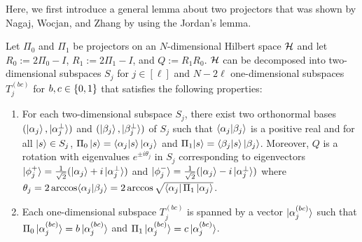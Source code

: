 Here, we first introduce a general lemma about two projectors that was shown by Nagaj, Wocjan, and Zhang \cite{NWZ09} by using the Jordan's lemma.
\begin{lemma}\label{lem:decomposition}
Let $\Pi_0$ and $\Pi_1$ be projectors on an $N$-dimensional Hilbert space $\mathcal{H}$ and let $R_0:= 2\Pi_0-I$, $R_1:= 2\Pi_1-I$, and $Q:=R_1R_0$. $\mathcal{H}$ can be decomposed into two-dimensional subspaces $S_j$ for $j\in[\ell]$ and $N-2\ell$ one-dimensional subspaces $T_j^{(bc)}$ for $b,c\in \{0,1\}$ that satisfies the following properties:
\begin{enumerate}
\item For each two-dimensional subspace $S_j$, there exist two orthonormal bases $(\ket{\alpha_j},\ket{\alpha_j^{\bot}})$ and $(\ket{\beta_j},\ket{\beta_j^{\bot}})$ of $S_j$ such that $\langle \alpha_j|\beta_j\rangle$ is a positive real and for all $ \ket{s}\in S_j$,  $\Pi_0 \ket{s} = \langle \alpha_j|s\rangle\ket{\alpha_j}$ and $\Pi_1 |s\rangle =\langle \beta_j|s\rangle\ket{\beta_j}$.  Moreover, $Q$ is a rotation with eigenvalues $e^{\pm i\theta_j}$ in $S_j$ corresponding to eigenvectors $\ket{\phi_j^+}=\frac{1}{\sqrt{2}}(\ket{\alpha_j}+i\ket{\alpha_j^\bot})$ and $\ket{\phi_j^-}=\frac{1}{\sqrt{2}}(\ket{\alpha_j}-i\ket{\alpha_j^\bot})$
where $\theta_j=2\arccos \langle \alpha_j|\beta_j\rangle=2\arccos\sqrt{\bra{\alpha_j}\Pi_1\ket{\alpha_j}}$.
\item  Each one-dimensional subspace $T_j^{(bc)}$ is spanned by a vector $\ket{\alpha_j^{(bc)}}$ such that $\Pi_0 \ket{\alpha_j^{(bc)}}=b \ket{\alpha_j^{(bc)}}$ and $\Pi_1 \ket{\alpha_j^{(bc)}}=c \ket{\alpha_j^{(bc)}}$.
\end{enumerate}
\end{lemma}


